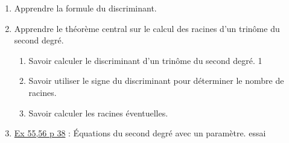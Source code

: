 \documentclass[a4paper,11pt]{article}
\theoremstyle{break}
\begin{document}
  \begin{Dev}
    
    \begin{enumerate}
      
      \item Apprendre la formule du discriminant.
      \item Apprendre le théorème central sur le calcul des racines 
	d'un trinôme du second degré.
      \begin{enumerate}
	\item Savoir calculer le discriminant d'un trinôme du second degré. 1
	\item Savoir utiliser le signe du discriminant pour déterminer
	le nombre de racines.
	\item Savoir calculer les racines éventuelles.
      \end{enumerate}
      \item
      \href{https://github.com/mathlorgues/math1sd1516/blob/master/images/55-56p38.png}
   {Ex 55,56 p 38} : \'Equations du second degré avec un paramètre.
      essai
    \end{enumerate}
  \end{Dev}


  
\end{document}
